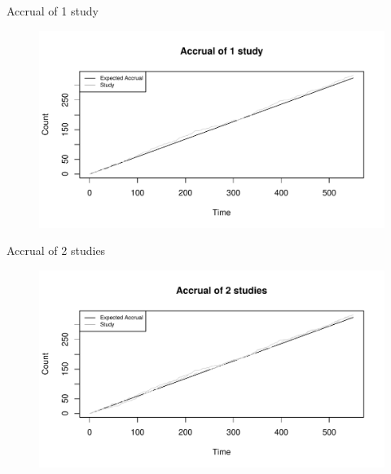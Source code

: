 \documentclass[english]{beamer}\usepackage[]{graphicx}\usepackage[]{xcolor}
\makeatletter
\def\maxwidth{ %
  \ifdim\Gin@nat@width>\linewidth
    \linewidth
  \else
    \Gin@nat@width
  \fi
}
\newenvironment{knitrout}{}{} %
\makeatother
\begin{document}
\begin{frame}{Accrual of 1 study}

\begin{figure}

\begin{knitrout}
\color{fgcolor}
\includegraphics[width=\maxwidth]{figures/figunnamed-chunk-2-1} 
\end{knitrout}
 
\end{figure}


\end{frame}

\begin{frame}{Accrual of 2 studies}

\begin{figure}

\begin{knitrout}
\color{fgcolor}
\includegraphics[width=\maxwidth]{figures/figunnamed-chunk-3-1} 
\end{knitrout}
  
\end{figure}


\end{frame}
\end{document}
